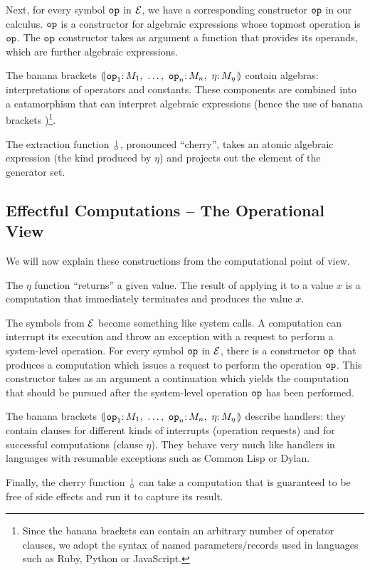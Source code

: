 Next, for every symbol $\mathtt{op}$ in $\mathcal{E}$, we have a corresponding
constructor $\mathtt{op}$ in our calculus. $\mathtt{op}$ is a constructor for
algebraic expressions whose topmost operation is $\mathtt{op}$. The $\mathtt{op}$
constructor takes as argument a function that provides its operands, which
are further algebraic expressions.

The banana brackets $\cdbanana$ contain algebras: interpretations of
operators and constants. These components are combined into a catamorphism
that can interpret algebraic expressions (hence the use of banana brackets
\cite{meijer1991functional})\footnote{Since the banana brackets can contain
  an arbitrary number of operator clauses, we adopt the syntax of named
  parameters/records used in languages such as Ruby, Python or
  JavaScript.}.

The extraction function $\cherry$, pronounced ``cherry'', takes an atomic
algebraic expression (the kind produced by $\eta$) and projects out the
element of the generator set.


\subsection*{Effectful Computations -- The Operational View}

We will now explain these constructions from the computational point of
view.

The $\eta$ function ``returns'' a given value. The result of applying it to
a value $x$ is a computation that immediately terminates and produces the
value $x$.

The symbols from $\mathcal{E}$ become something like system calls. A computation
can interrupt its execution and throw an exception with a request to
perform a system-level operation. For every symbol $\mathtt{op}$ in $\mathcal{E}$,
there is a constructor $\mathtt{op}$ that produces a computation which issues a
request to perform the operation $\mathtt{op}$. This constructor takes as an
argument a continuation which yields the computation that should be pursued
after the system-level operation $\mathtt{op}$ has been performed.

The banana brackets $\cdbanana$ describe handlers: they contain clauses for
different kinds of interrupts (operation requests) and for successful
computations (clause $\eta$). They behave very much like handlers in
languages with resumable exceptions such as Common Lisp or Dylan.

Finally, the cherry function $\cherry$ can take a computation that is
guaranteed to be free of side effects and run it to capture its result.

